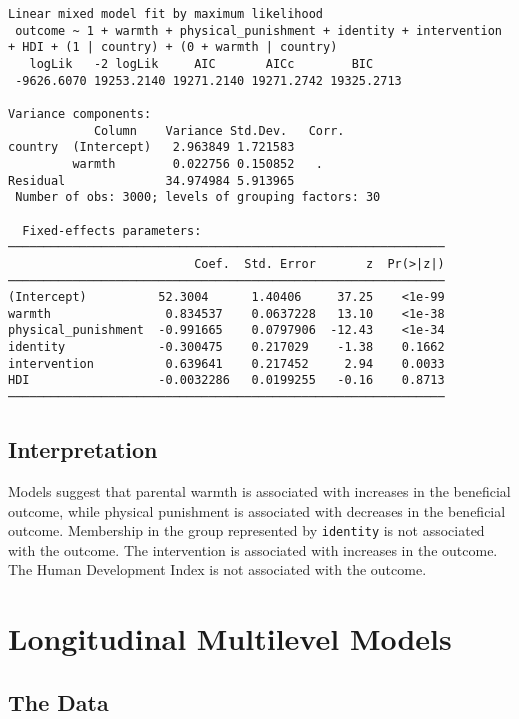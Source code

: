 \documentclass[
  letterpaper,
  DIV=11,
  numbers=noendperiod]{scrreprt}
\begin{document}
\begin{verbatim}
Linear mixed model fit by maximum likelihood
 outcome ~ 1 + warmth + physical_punishment + identity + intervention + HDI + (1 | country) + (0 + warmth | country)
   logLik   -2 logLik     AIC       AICc        BIC    
 -9626.6070 19253.2140 19271.2140 19271.2742 19325.2713

Variance components:
            Column    Variance Std.Dev.   Corr.
country  (Intercept)   2.963849 1.721583
         warmth        0.022756 0.150852   .  
Residual              34.974984 5.913965
 Number of obs: 3000; levels of grouping factors: 30

  Fixed-effects parameters:
─────────────────────────────────────────────────────────────
                          Coef.  Std. Error       z  Pr(>|z|)
─────────────────────────────────────────────────────────────
(Intercept)          52.3004      1.40406     37.25    <1e-99
warmth                0.834537    0.0637228   13.10    <1e-38
physical_punishment  -0.991665    0.0797906  -12.43    <1e-34
identity             -0.300475    0.217029    -1.38    0.1662
intervention          0.639641    0.217452     2.94    0.0033
HDI                  -0.0032286   0.0199255   -0.16    0.8713
─────────────────────────────────────────────────────────────
\end{verbatim}

\section{Interpretation}\label{interpretation-2}

Models suggest that parental warmth is associated with increases in the
beneficial outcome, while physical punishment is associated with
decreases in the beneficial outcome. Membership in the group represented
by \texttt{identity} is not associated with the outcome. The
intervention is associated with increases in the outcome. The Human
Development Index is not associated with the outcome.


\chapter{Longitudinal Multilevel
Models}\label{longitudinal-multilevel-models}

\section{The Data}\label{the-data}
\end{document}
